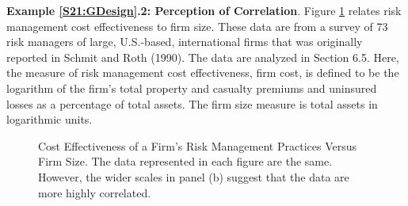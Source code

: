 \linejed

\textbf{Example \ref{S21:GDesign}.2: Perception of Correlation}.
Figure \ref{F21:FirmRMcostvsSize} relates risk management cost
effectiveness to firm size. These data are from a survey of 73 risk
managers of large, U.S.-based, international firms that was
originally reported in Schmit and Roth (1990). The data are analyzed
in Section 6.5. Here, the measure of risk management cost
effectiveness, firm cost, is defined to be the logarithm of the
firm's total property and casualty premiums and uninsured losses as
a percentage of total assets. The firm size measure is total assets
in logarithmic units.


\begin{figure}[htp]
  \begin{center}  \hfill
    \caption{\label{F21:FirmRMcostvsSize} \small Cost
Effectiveness of a Firm's Risk Management Practices Versus Firm
Size. The data represented in each figure are the same. However, the
wider scales in panel (b) suggest that the data are more highly
correlated.}
  \end{center}
\end{figure}


